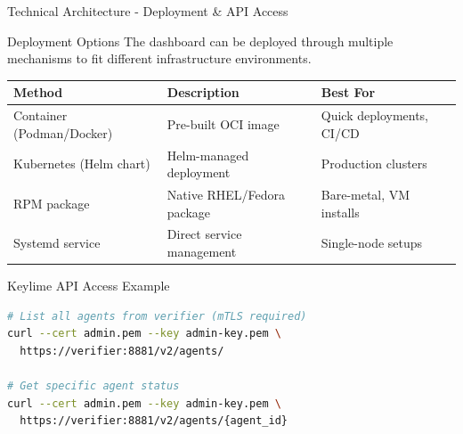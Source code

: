 \begin{frame}[fragile]{Technical Architecture - Deployment \& API Access}
  \begin{block}{Deployment Options}
    \scriptsize
    The dashboard can be deployed through multiple mechanisms to fit different
    infrastructure environments.
  \end{block}

  \vspace{0.1cm}

  \scriptsize
  \begin{center}
    \begin{tabular}{|l|p{4cm}|p{3.5cm}|}
      \hline
      \textbf{Method} & \textbf{Description} & \textbf{Best For} \\
      \hline
      \hline
      Container (Podman/Docker) & Pre-built OCI image & Quick deployments, CI/CD \\
      \hline
      Kubernetes (Helm chart) & Helm-managed deployment & Production clusters \\
      \hline
      RPM package & Native RHEL/Fedora package & Bare-metal, VM installs \\
      \hline
      Systemd service & Direct service management & Single-node setups \\
      \hline
    \end{tabular}
  \end{center}

  \vspace{0.2cm}

  \begin{exampleblock}{Keylime API Access Example}
    \begin{lstlisting}[language=bash, numbers=none, basicstyle=\ttfamily\tiny]
# List all agents from verifier (mTLS required)
curl --cert admin.pem --key admin-key.pem \
  https://verifier:8881/v2/agents/

# Get specific agent status
curl --cert admin.pem --key admin-key.pem \
  https://verifier:8881/v2/agents/{agent_id}
    \end{lstlisting}
  \end{exampleblock}
\end{frame}
